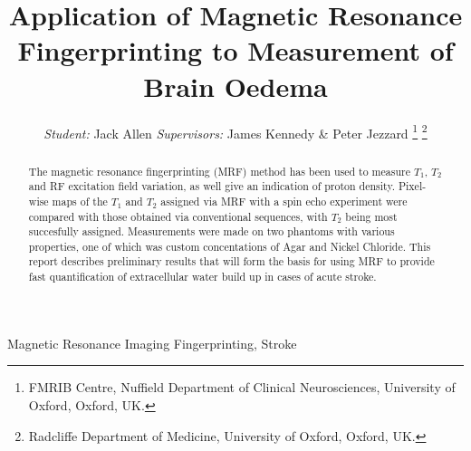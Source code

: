\documentclass[journal]{IEEEtran}
\begin{document}







\title{ Application of Magnetic Resonance Fingerprinting to Measurement of Brain Oedema} 


\author{\textit{Student:} Jack Allen \textit{Supervisors:} James Kennedy \& Peter Jezzard \thanks{FMRIB Centre, Nuffield Department of Clinical Neurosciences, University of Oxford, Oxford, UK.} \thanks{Radcliffe Department of Medicine, University of Oxford, Oxford, UK.}}


\maketitle


\begin{abstract}
The magnetic resonance fingerprinting (MRF) method has been used to measure $T_1$, $T_2$ and RF excitation field variation, as well give an indication of proton density. Pixel-wise maps of the $T_1$ and $T_2$ assigned via MRF with a spin echo experiment were compared with those obtained via conventional sequences, with $T_2$ being most succesfully assigned. Measurements were made on two phantoms with various properties, one of which was custom concentations of Agar and Nickel Chloride. This report describes preliminary results that will form the basis for using MRF to provide fast quantification of extracellular water build up in cases of acute stroke. 
\end{abstract}


\begin{IEEEkeywords}
Magnetic Resonance Imaging Fingerprinting, Stroke
\end{IEEEkeywords}
\end{document}
